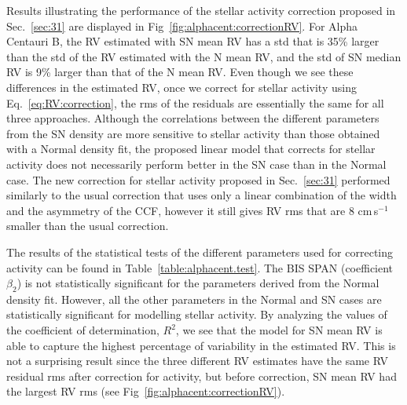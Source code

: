 \documentclass{aa}
\def\cms{\hbox{\,cm\,s$^{-1}$}}       %
\begin{document}
Results illustrating the performance of the stellar activity correction proposed in Sec.~\ref{sec:31} are displayed in Fig~\ref{fig:alphacent:correctionRV}. 
For Alpha Centauri B, the RV estimated with SN mean RV has a std that is 35\% larger than the std of the RV estimated with the N mean RV, and the std of SN median RV is 9\% larger than that of the N mean RV.
Even though we see these differences in the estimated RV, once we correct for stellar activity using Eq.~\eqref{eq:RV:correction}, 
the rms of the residuals are essentially the same for all three approaches.
Although the correlations between the different parameters from the SN density are more sensitive to stellar activity than those obtained with a Normal density fit,
the proposed linear model that corrects for stellar activity does not necessarily perform better in the SN case than in the Normal case. 
The new correction for stellar activity proposed in Sec.~\ref{sec:31} performed similarly to the usual correction that uses only a linear combination of the width and the asymmetry of the CCF, however it still gives RV rms that are 8\,\cms\,smaller than the usual correction.


The results of the statistical tests of the different parameters used for correcting activity can be found in Table~\ref{table:alphacent.test}.  The BIS SPAN (coefficient $\beta_2$) is not statistically significant for the parameters derived from the Normal density fit. 
However, all the other parameters in the Normal and SN cases are statistically significant for modelling stellar activity. 
By analyzing the values of the coefficient of determination, $R^2$, we see that the model for SN mean RV is able to capture the highest percentage of variability in the estimated RV. 
This is not a surprising result since the three different RV estimates have the same RV residual rms after correction for activity, but before correction, SN mean RV had the largest RV rms (see Fig~\ref{fig:alphacent:correctionRV}).
\end{document}
